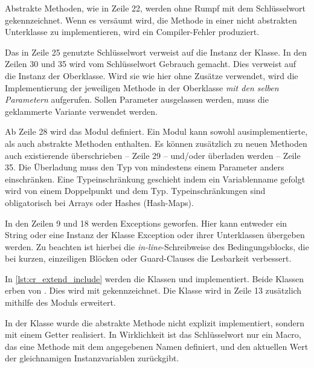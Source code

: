 

Abstrakte Methoden, wie in Zeile 22, werden ohne Rumpf mit dem Schlüsselwort
 gekennzeichnet.  Wenn es versäumt wird, die Methode in einer
nicht abstrakten Unterklasse zu implementieren, wird ein Compiler-Fehler
produziert.

Das in Zeile 25 genutzte Schlüsselwort  verweist auf die Instanz
der Klasse.  In den Zeilen 30 und 35 wird vom Schlüsselwort 
Gebrauch gemacht.  Dies verweist auf die Instanz der Oberklasse.  Wird sie wie
hier ohne Zusätze verwendet, wird die Implementierung der jeweiligen Methode in
der Oberklasse \emph{mit den selben Parametern} aufgerufen.  Sollen Parameter
ausgelassen werden, muss die geklammerte Variante
 verwendet werden.

Ab Zeile 28 wird das Modul  definiert.  Ein Modul kann sowohl
ausimplementierte, als auch abstrakte Methoden enthalten.  Es können zusätzlich
zu neuen Methoden auch existierende überschrieben -- Zeile 29 -- und/oder
überladen werden -- Zeile 35.  Die Überladung muss den Typ von mindestens einem
Parameter anders einschränken.  Eine Typeinschränkung geschieht indem ein
Variablenname gefolgt wird von einem Doppelpunkt und dem Typ.
Typeinschränkungen sind obligatorisch bei Arrays oder Hashes (Hash-Maps).

In den Zeilen 9 und 18 werden Exceptions geworfen.  Hier kann entweder ein
String oder eine Instanz der Klasse Exception oder ihrer Unterklassen übergeben
werden.  Zu beachten ist hierbei die \emph{in-line}-Schreibweise des
Bedingungsblocks, die bei kurzen, einzeiligen Blöcken oder Guard-Clauses die
Lesbarkeit verbessert.

In \cref{lst:cr_extend_include} werden die Klassen  und 
implementiert.  Beide Klassen erben von .  Dies wird mit
 gekennzeichnet.  Die Klasse  wird in Zeile 13
zusätzlich mithilfe des Moduls  erweitert.



In der Klasse  wurde die abstrakte Methode  nicht
explizit implementiert, sondern mit einem Getter realisiert.  In Wirklichkeit ist
das Schlüsselwort  nur ein Macro, das eine Methode mit dem
angegebenen Namen definiert, und den aktuellen Wert der gleichnamigen
Instanzvariablen zurückgibt.


